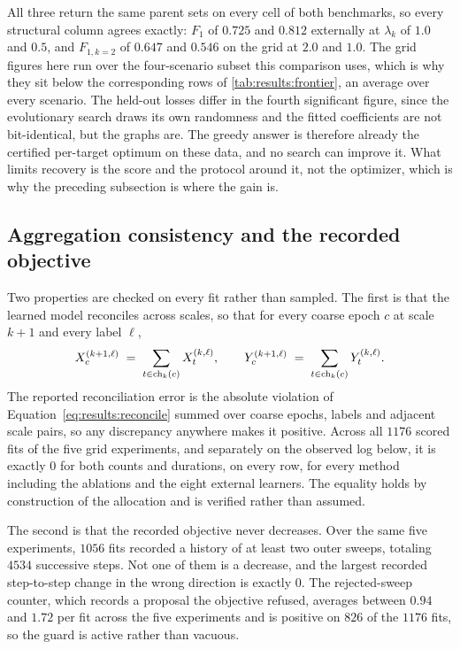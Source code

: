 All three return the same parent sets on every cell of both benchmarks, so
every structural column agrees exactly: $F_1$ of $0.725$ and $0.812$ externally
at $\lambda_k$ of $1.0$ and $0.5$, and $F_{1,k=2}$ of $0.647$ and $0.546$ on
the grid at $2.0$ and $1.0$. The grid figures here run over the four-scenario
subset this comparison uses, which is why they sit below the corresponding rows
of \cref{tab:results:frontier}, an average over every scenario. The held-out losses differ in the fourth
significant figure, since the evolutionary search draws its own randomness and
the fitted coefficients are not bit-identical, but the graphs are. The greedy answer is therefore already
the certified per-target optimum on these data, and no search can improve it.
What limits recovery is the score and the protocol around it, not the
optimizer, which is why the preceding subsection is where the gain is.

\subsection{Aggregation consistency and the recorded objective}
\label{sec:results:invariants}

Two properties are checked on every fit rather than sampled. The first is that
the learned model reconciles across scales, so that for every coarse epoch $c$
at scale $k+1$ and every label $\ell$,
\begin{equation}
X_c^{(k+1,\ell)} \;=\; \sum_{t \in \operatorname{ch}_k(c)} X_t^{(k,\ell)},
\qquad
Y_c^{(k+1,\ell)} \;=\; \sum_{t \in \operatorname{ch}_k(c)} Y_t^{(k,\ell)} .
\label{eq:results:reconcile}
\end{equation}
The reported reconciliation error is the absolute violation of
Equation~\ref{eq:results:reconcile} summed over coarse epochs, labels and
adjacent scale pairs, so any discrepancy anywhere makes it positive. Across all
$1176$ scored fits of the five grid experiments, and separately on the observed
log below, it is exactly $0$ for both counts and durations, on every row, for
every method including the ablations and the eight external learners. The
equality holds by construction of the allocation and is verified rather than
assumed.

The second is that the recorded objective never decreases. Over the same five
experiments, $1056$ fits recorded a history of at least two outer sweeps,
totaling $4534$ successive steps. Not one of them is a decrease, and the
largest recorded step-to-step change in the wrong direction is exactly $0$. The
rejected-sweep counter, which records a proposal the objective refused, averages
between $0.94$ and $1.72$ per fit across the five experiments and is positive on
$826$ of the $1176$ fits, so the guard is active rather than vacuous.

